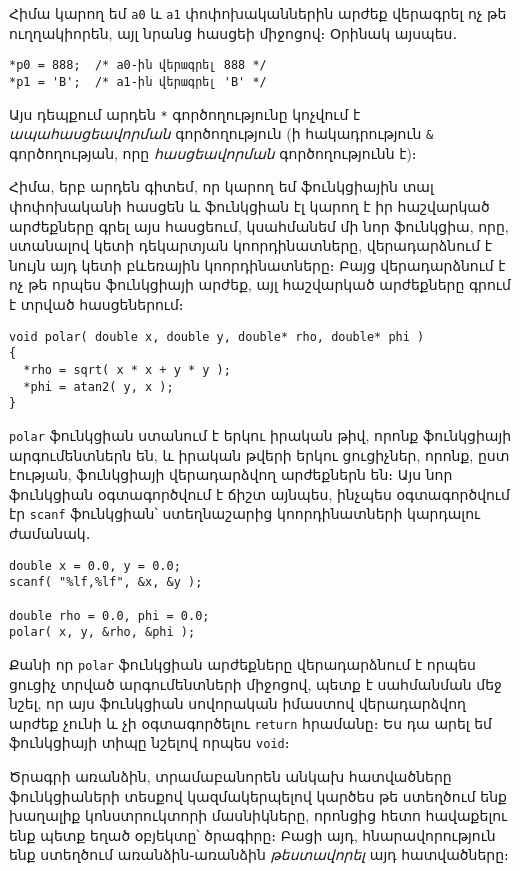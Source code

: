 Հիմա կարող եմ \texttt{a0} և \texttt{a1} փոփոխականներին արժեք վերագրել ոչ թե
ուղղակիորեն, այլ նրանց հասցեի միջոցով։ Օրինակ այսպես․

\begin{verbatim}
*p0 = 888;  /* a0-ին վերագրել 888 */
*p1 = 'B';  /* a1-ին վերագրել 'B' */
\end{verbatim}

Այս դեպքում արդեն \verb|*| գործողությունը կոչվում է \emph{ապահասցեավորման}
գործողություն (ի հակադրություն \verb|&| գործողության, որը \emph{հասցեավորման}
գործողությունն է)։

Հիմա, երբ արդեն գիտեմ, որ կարող եմ ֆունկցիային տալ փոփոխականի հասցեն և
ֆունկցիան էլ կարող է իր հաշվարկած արժեքները գրել այս հասցեում, կսահմանեմ
մի նոր ֆունկցիա, որը, ստանալով կետի դեկարտյան կոորդինատները, վերադարձնում
է նույն այդ կետի բևեռային կոորդինատները։ Բայց վերադարձնում է ոչ թե որպես
ֆունկցիայի արժեք, այլ հաշվարկած արժեքները գրում է տրված հասցեներում։

\begin{verbatim}
void polar( double x, double y, double* rho, double* phi )
{
  *rho = sqrt( x * x + y * y );
  *phi = atan2( y, x );
}
\end{verbatim}

\texttt{polar} ֆունկցիան ստանում է երկու իրական թիվ, որոնք ֆունկցիայի
արգումենտներն են, և իրական թվերի երկու ցուցիչներ, որոնք, ըստ էության,
ֆունկցիայի վերադարձվող արժեքներն են։ Այս նոր ֆունկցիան օգտագործվում է
ճիշտ այնպես, ինչպես օգտագործվում էր \texttt{scanf} ֆունկցիան՝ ստեղնաշարից
կոորդինատների կարդալու ժամանակ․

\begin{verbatim}
double x = 0.0, y = 0.0;
scanf( "%lf,%lf", &x, &y );

double rho = 0.0, phi = 0.0;
polar( x, y, &rho, &phi );
\end{verbatim}

Քանի որ \texttt{polar} ֆունկցիան արժեքները վերադարձնում է որպես ցուցիչ
տրված արգումենտների միջոցով, պետք է սահմանման մեջ նշել, որ այս ֆունկցիան
սովորական իմաստով վերադարձվող արժեք չունի և չի օգտագործելու \texttt{return}
հրամանը։ Ես դա արել եմ ֆունկցիայի տիպը նշելով որպես \texttt{void}։


Ծրագրի առանձին, տրամաբանորեն անկախ հատվածները ֆունկցիաների տեսքով
կազմակերպելով կարծես թե ստեղծում ենք խաղալիք կոնստրուկտորի մասնիկները,
որոնցից հետո հավաքելու ենք պետք եղած օբյեկտը՝ ծրագիրը։ Բացի այդ,
հնարավորություն ենք ստեղծում առանձին֊առանձին \emph{թեստավորել} այդ հատվածները։


